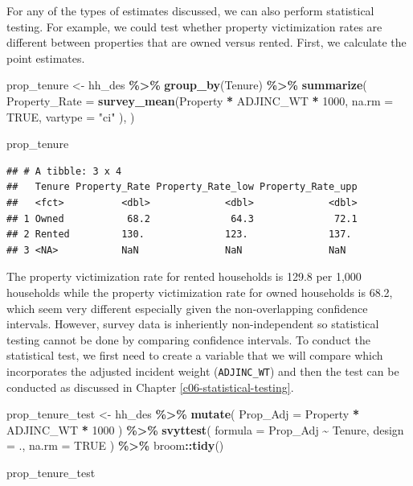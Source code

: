 \documentclass[
]{krantz}
\makeatletter
\newenvironment{Shaded}{\begin{snugshade}}{\end{snugshade}}
\newcommand{\AttributeTok}[1]{\textcolor[rgb]{0.27,0.27,0.27}{#1}}
\newcommand{\ConstantTok}[1]{\textcolor[rgb]{0.37,0.37,0.37}{#1}}
\newcommand{\DecValTok}[1]{\textcolor[rgb]{0.06,0.06,0.06}{#1}}
\newcommand{\FunctionTok}[1]{\textcolor[rgb]{0.27,0.27,0.27}{\textbf{#1}}}
\newcommand{\NormalTok}[1]{#1}
\newcommand{\OtherTok}[1]{\textcolor[rgb]{0.37,0.37,0.37}{#1}}
\newcommand{\SpecialCharTok}[1]{\textcolor[rgb]{0.43,0.43,0.43}{\textbf{#1}}}
\newcommand{\StringTok}[1]{\textcolor[rgb]{0.5,0.5,0.5}{#1}}
\newenvironment{kframe}{%
\medskip{}
\setlength{\fboxsep}{.8em}
 \def\at@end@of@kframe{}%
 \ifinner\ifhmode%
  \def\at@end@of@kframe{\end{minipage}}%
  \begin{minipage}{\columnwidth}%
 \fi\fi%
 \def\FrameCommand##1{\hskip\@totalleftmargin \hskip-\fboxsep
 \colorbox{shadecolor}{##1}\hskip-\fboxsep
     \hskip-\linewidth \hskip-\@totalleftmargin \hskip\columnwidth}%
 \MakeFramed {\advance\hsize-\width
   \@totalleftmargin\z@ \linewidth\hsize
   \@setminipage}}%
 {\par\unskip\endMakeFramed%
 \at@end@of@kframe}
\renewenvironment{Shaded}{\begin{kframe}}{\end{kframe}}
\makeatother
\begin{document}
For any of the types of estimates discussed, we can also perform statistical testing. For example, we could test whether property victimization rates are different between properties that are owned versus rented. First, we calculate the point estimates.

\begin{Shaded}
\begin{Highlighting}[]
\NormalTok{prop\_tenure }\OtherTok{\textless{}{-}}\NormalTok{ hh\_des }\SpecialCharTok{\%\textgreater{}\%}
  \FunctionTok{group\_by}\NormalTok{(Tenure) }\SpecialCharTok{\%\textgreater{}\%}
  \FunctionTok{summarize}\NormalTok{(}
    \AttributeTok{Property\_Rate =} \FunctionTok{survey\_mean}\NormalTok{(Property }\SpecialCharTok{*}\NormalTok{ ADJINC\_WT }\SpecialCharTok{*} \DecValTok{1000}\NormalTok{,}
      \AttributeTok{na.rm =} \ConstantTok{TRUE}\NormalTok{, }\AttributeTok{vartype =} \StringTok{"ci"}
\NormalTok{    ),}
\NormalTok{  )}

\NormalTok{prop\_tenure}
\end{Highlighting}
\end{Shaded}

\begin{verbatim}
## # A tibble: 3 x 4
##   Tenure Property_Rate Property_Rate_low Property_Rate_upp
##   <fct>          <dbl>             <dbl>             <dbl>
## 1 Owned           68.2              64.3              72.1
## 2 Rented         130.              123.              137. 
## 3 <NA>           NaN               NaN               NaN
\end{verbatim}

The property victimization rate for rented households is 129.8 per 1,000 households while the property victimization rate for owned households is 68.2, which seem very different especially given the non-overlapping confidence intervals. However, survey data is inheriently non-independent so statistical testing cannot be done by comparing confidence intervals. To conduct the statistical test, we first need to create a variable that we will compare which incorporates the adjusted incident weight (\texttt{ADJINC\_WT}) and then the test can be conducted as discussed in Chapter \ref{c06-statistical-testing}.

\begin{Shaded}
\begin{Highlighting}[]
\NormalTok{prop\_tenure\_test }\OtherTok{\textless{}{-}}\NormalTok{ hh\_des }\SpecialCharTok{\%\textgreater{}\%}
  \FunctionTok{mutate}\NormalTok{(}
    \AttributeTok{Prop\_Adj =}\NormalTok{ Property }\SpecialCharTok{*}\NormalTok{ ADJINC\_WT }\SpecialCharTok{*} \DecValTok{1000}
\NormalTok{  ) }\SpecialCharTok{\%\textgreater{}\%}
  \FunctionTok{svyttest}\NormalTok{(}
    \AttributeTok{formula =}\NormalTok{ Prop\_Adj }\SpecialCharTok{\textasciitilde{}}\NormalTok{ Tenure,}
    \AttributeTok{design =}\NormalTok{ .,}
    \AttributeTok{na.rm =} \ConstantTok{TRUE}
\NormalTok{  ) }\SpecialCharTok{\%\textgreater{}\%}
\NormalTok{  broom}\SpecialCharTok{::}\FunctionTok{tidy}\NormalTok{()}

\NormalTok{prop\_tenure\_test}
\end{Highlighting}
\end{Shaded}
\end{document}
